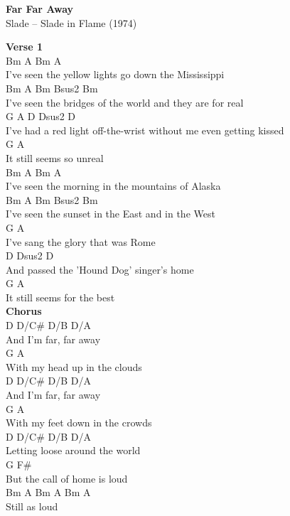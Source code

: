 \documentclass[a4paper]{article}
\begin{document}
    \begin{center}
        \textbf{Far Far Away}
        ~\\
        Slade -- Slade in Flame (1974)
    \end{center}
    {
        \scriptsize
        \textbf{Verse 1}
        ~\\
        {
            \cutive
            \obeyspaces
              Bm               A               Bm     A
\\
I've seen the yellow lights go down the Mississippi
\\
              Bm             A                      Bm   Bsus2 Bm
\\
I've seen the bridges of the world and they are for real
\\
           G                 A                D     Dsus2  D
\\
I've had a red light off-the-wrist without me even getting kissed
\\
   G                A
\\
It still seems so unreal
\\
              Bm             A             Bm     A
\\
I've seen the morning in the mountains of Alaska
\\
              Bm            A               Bm   Bsus2 Bm
\\
I've seen the sunset in the East and in the West
\\
              G              A
\\
I've sang the glory that was Rome
\\
                D          Dsus2    D
\\
And passed the 'Hound Dog' singer's home
\\
   G                   A
\\
It still seems for the best
\\

        }
        \textbf{Chorus}
        ~\\
        {
            \cutive
            \obeyspaces
        D    D/C\# D/B  D/A
\\
And I'm far, far away
\\
        G              A
\\
With my head up in the clouds
\\
        D    D/C\# D/B  D/A
\\
And I'm far, far away
\\
        G                A
\\
With my feet down in the crowds
\\
        D       D/C\#     D/B  D/A
\\
Letting loose around the world
\\
        G               F\#
\\
But the call of home is loud
\\
         Bm    A  Bm   A   Bm   A
\\
Still as loud
\\

}}
\end{document}
